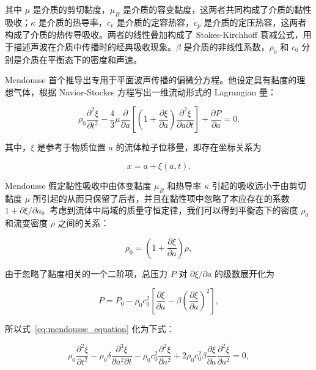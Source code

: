 其中 $\mu$ 是介质的剪切黏度，$\mu_{B}$ 是介质的容变黏度，这两者共同构成了介质的黏性吸收；$\kappa$ 是介质的热导率，$c_{v}$ 是介质的定容热容，$c_{p}$ 是介质的定压热容，这两者构成了介质的热传导吸收。两者的线性叠加构成了 Stokes-Kirchhoff 衰减公式，用于描述声波在介质中传播时的经典吸收现象。$\beta$ 是介质的非线性系数，$\rho_{0}$ 和 $c_{0}$ 分别是介质在平衡态下的密度和声速。

Mendousse 首个推导出专用于平面波声传播的偏微分方程。他设定具有黏度的理想气体，根据 Navior-Stockes 方程写出一维流动形式的 Lagrangian 量\cite{hamilton_nonlinear_1998}：

\begin{equation}
  \rho_{0}\frac{\partial^{2}\xi}{\partial t^{2}} - \frac{4}{3}\mu\frac{\partial }{\partial a}\left[\left(1 + \frac{\partial\xi}{\partial a}\right)\frac{\partial^{2}\xi}{\partial a\partial t}\right] + \frac{\partial P}{\partial a} = 0.\label{eq:mendousse_equation}
\end{equation}

其中，$\xi$ 是参考于物质位置 $a$ 的流体粒子位移量，即存在坐标关系为

\begin{equation}
  x = a + \xi(a,t).
\end{equation}

Mendousse 假定黏性吸收中由体变黏度 $\mu_{B}$ 和热导率 $\kappa$ 引起的吸收远小于由剪切黏度 $\mu$ 所引起的从而只保留了后者，并且在黏性项中忽略了本应存在的系数 $1+\partial\xi/\partial a$。考虑到流体中局域的质量守恒定律，我们可以得到平衡态下的密度 $\rho_{0}$ 和流变密度 $\rho$ 之间的关系：

\begin{equation}
  \rho_{0} = \left(1 + \frac{\partial\xi}{\partial a}\right)\rho,
\end{equation}

由于忽略了黏度相关的一个二阶项，总压力 $P$ 对 $\partial\xi/\partial a$ 的级数展开化为

\begin{equation}
  P = P_{0} - \rho_{0}c_{0}^{2}\left[\frac{\partial\xi}{\partial a} - \beta\left(\frac{\partial\xi}{\partial a}\right)^{2}\right],
\end{equation}

所以式~\eqref{eq:mendousse_equation} 化为下式：

\begin{equation}
  \rho_{0}\frac{\partial^{2}\xi}{\partial t^{2}} - \rho_{0}\delta\frac{\partial^{3}\xi}{\partial a^{2}\partial t} - \rho_{0}c_{0}^{2}\frac{\partial^{2}\xi}{\partial a^{2}} + 2\rho_{0}c_{0}^{2}\beta\frac{\partial\xi}{\partial a}\frac{\partial^{2}\xi}{\partial a^{2}} = 0,\label{eq:progressive_burgers_equation}
\end{equation}

